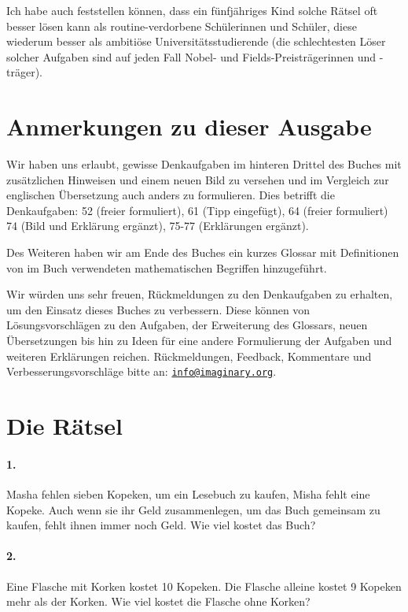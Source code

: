 \documentclass[10pt,a5paper,twoside]{article}
\newenvironment{problem}[1]{\paragraph*{#1}}{}
\begin{document}
Ich habe auch feststellen können, dass ein fünfjähriges Kind solche Rätsel oft besser lösen kann als routine-verdorbene Schülerinnen und Schüler, diese wiederum besser als ambitiöse Universitätsstudierende (die schlechtesten Löser solcher Aufgaben sind auf jeden Fall Nobel- und Fields-Preisträgerinnen und -träger).

\clearpage
\section*{Anmerkungen zu dieser Ausgabe}
Wir haben uns erlaubt, gewisse Denkaufgaben im hinteren Drittel des Buches mit zusätzlichen Hinweisen und einem neuen Bild zu versehen und im Vergleich zur englischen Übersetzung auch anders zu formulieren. Dies betrifft die Denkaufgaben:
52 (freier formuliert), 61 (Tipp eingefügt), 64 (freier formuliert) 74 (Bild und Erklärung ergänzt), 75-77 (Erklärungen ergänzt).

Des Weiteren haben wir am Ende des Buches ein kurzes Glossar mit Definitionen von im Buch verwendeten mathematischen Begriffen hinzugeführt.

Wir würden uns sehr freuen, Rückmeldungen zu den Denkaufgaben zu erhalten, um den Einsatz dieses Buches zu verbessern. Diese können von Lösungsvorschlägen zu den Aufgaben, der Erweiterung des Glossars, neuen Übersetzungen bis hin zu Ideen für eine andere Formulierung der Aufgaben und weiteren Erklärungen reichen. Rückmeldungen, Feedback, Kommentare und Verbesserungsvorschläge bitte an:
\href{mailto:info@imaginary.org}{\nolinkurl{info@imaginary.org}}.

\clearpage
\section*{Die Rätsel}

%
%

%
\begin{problem}{1.}
	Masha fehlen sieben Kopeken, um ein Lesebuch zu kaufen, Misha fehlt eine Kopeke. Auch wenn sie ihr Geld zusammenlegen, um das Buch gemeinsam zu kaufen, fehlt ihnen immer noch Geld. Wie viel kostet das Buch?
\end{problem}

\begin{problem}{2.}
	Eine Flasche mit Korken kostet 10 Kopeken. Die Flasche alleine kostet 9 Kopeken mehr als der Korken. Wie viel kostet die Flasche ohne Korken?
\end{problem}
\end{document}
